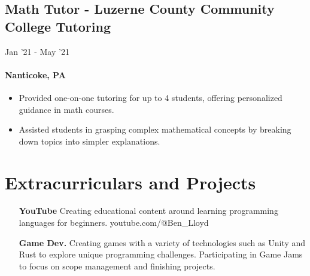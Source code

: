 \documentclass{article}
\begin{document}
\subsection{Math Tutor - Luzerne County Community College Tutoring} \hfill Jan '21 - May '21
\paragraph{Nanticoke, PA}
\begin{itemize}
  \itemsep0em 
  \item Provided one-on-one tutoring for up to 4 students, offering personalized guidance in math courses.
  \item Assisted students in grasping complex mathematical concepts by breaking down topics into simpler explanations.
\end{itemize}

\section{Extracurriculars and Projects}
\begin{itemize}
  \itemsep0em 
  \item[\bfseries YouTube] Creating educational content around learning programming languages for beginners. youtube.com/@Ben\_Lloyd
  \item[\bfseries Game Dev.] Creating games with a variety of technologies such as Unity and Rust to explore unique programming challenges. Participating in Game Jams to focus on scope management and finishing projects.
\end{itemize}

\thispagestyle{empty}
\end{document}
